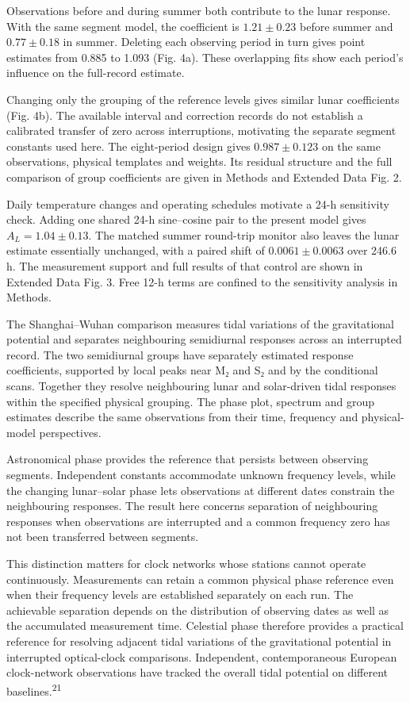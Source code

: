 \documentclass[
  12pt,
  a4paper,
]{article}
\begin{document}
Observations before and during summer both contribute to the lunar
response. With the same segment model, the coefficient is
\(1.21\pm0.23\) before summer and \(0.77\pm0.18\) in summer. Deleting
each observing period in turn gives point estimates from 0.885 to 1.093
(Fig. 4a). These overlapping fits show each period's influence on the
full-record estimate.

Changing only the grouping of the reference levels gives similar lunar
coefficients (Fig. 4b). The available interval and correction records do
not establish a calibrated transfer of zero across interruptions,
motivating the separate segment constants used here. The eight-period
design gives \(0.987\pm0.123\) on the same observations, physical
templates and weights. Its residual structure and the full comparison of
group coefficients are given in Methods and Extended Data Fig. 2.

Daily temperature changes and operating schedules motivate a 24-h
sensitivity check. Adding one shared 24-h sine--cosine pair to the
present model gives \(A_L=1.04\pm0.13\). The matched summer round-trip
monitor also leaves the lunar estimate essentially unchanged, with a
paired shift of \(0.0061\pm0.0063\) over 246.6 h. The measurement
support and full results of that control are shown in Extended Data Fig.
3. Free 12-h terms are confined to the sensitivity analysis in Methods.

The Shanghai--Wuhan comparison measures tidal variations of the
gravitational potential and separates neighbouring semidiurnal responses
across an interrupted record. The two semidiurnal groups have separately
estimated response coefficients, supported by local peaks near M₂ and S₂
and by the conditional scans. Together they resolve neighbouring lunar
and solar-driven tidal responses within the specified physical grouping.
The phase plot, spectrum and group estimates describe the same
observations from their time, frequency and physical-model perspectives.

Astronomical phase provides the reference that persists between
observing segments. Independent constants accommodate unknown frequency
levels, while the changing lunar--solar phase lets observations at
different dates constrain the neighbouring responses. The result here
concerns separation of neighbouring responses when observations are
interrupted and a common frequency zero has not been transferred between
segments.

This distinction matters for clock networks whose stations cannot
operate continuously. Measurements can retain a common physical phase
reference even when their frequency levels are established separately on
each run. The achievable separation depends on the distribution of
observing dates as well as the accumulated measurement time. Celestial
phase therefore provides a practical reference for resolving adjacent
tidal variations of the gravitational potential in interrupted
optical-clock comparisons. Independent, contemporaneous European
clock-network observations have tracked the overall tidal potential on
different baselines.\textsuperscript{21}
\end{document}
